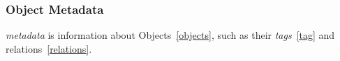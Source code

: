 \subsubsection{Object Metadata}
\label{object_metadata}

\emph{metadata} is information about Objects~\ref{objects}, such as their \emph{tags}~\ref{tag} and relations~\ref{relations}. 
